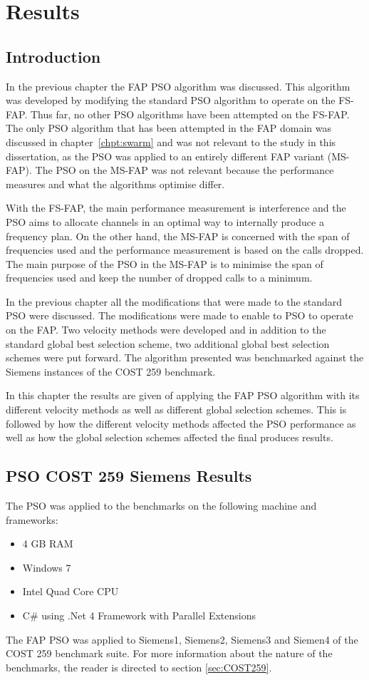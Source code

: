 \chapter{Results}
\label{chpt:results}
\section{Introduction}
In the previous chapter the FAP PSO algorithm was discussed. This algorithm was developed by modifying the standard PSO algorithm to operate on the FS-FAP. Thus far, no other PSO algorithms have been attempted on the FS-FAP. The only PSO algorithm that has been attempted in the FAP domain was discussed in chapter~\ref{chpt:swarm} and was not relevant to the study in this dissertation, as the PSO was applied to an entirely different FAP variant (MS-FAP). The PSO on the MS-FAP was not relevant because the performance measures and what the algorithms optimise differ.

With the FS-FAP, the main performance measurement is interference and the PSO aims to allocate channels in an optimal way to internally produce a frequency plan. On the other hand, the MS-FAP is concerned with the span of frequencies used and the performance measurement is based on the calls dropped. The main purpose of the PSO in the MS-FAP is to minimise the span of frequencies used and keep the number of dropped calls to a minimum.

In the previous chapter all the modifications that were made to the standard PSO were discussed. The modifications were made to enable to PSO to operate on the FAP. Two velocity methods were developed and in addition to the standard global best selection scheme, two additional global best selection schemes were put forward. The algorithm presented was benchmarked against the Siemens instances of the COST 259 benchmark.

In this chapter the results are given of applying the FAP PSO algorithm with its different velocity methods as well as different global selection schemes. This is followed by how the different velocity methods affected the PSO performance as well as how the global selection schemes affected the final produces results.

\section{PSO COST 259 Siemens Results}
The PSO was applied to the benchmarks on the following machine and frameworks:
\begin{itemize}
\item 4 GB RAM
\item Windows 7
\item Intel Quad Core CPU
\item C\# using .Net 4 Framework with Parallel Extensions
\end{itemize}
The FAP PSO was applied to Siemens1, Siemens2, Siemens3 and Siemen4 of the COST 259 benchmark suite. For more information about the nature of the benchmarks, the reader is directed to section \ref{sec:COST259}.

